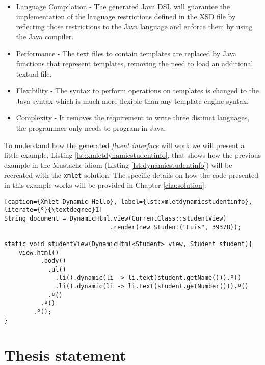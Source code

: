 \begin{itemize}
	\item Language Compilation - The generated Java \ac{DSL} will guarantee the implementation of the language restrictions defined in the \ac{XSD} file by reflecting those restrictions to the Java language and enforce them by using the Java compiler.
	\item Performance - The text files to contain templates are replaced by Java functions that represent templates, removing the need to load an additional textual file.
	\item Flexibility - The syntax to perform operations on templates is changed to the Java syntax which is much more flexible than any template engine syntax.
	\item Complexity - It removes the requirement to write three distinct languages, the programmer only needs to program in Java.
\end{itemize}

\noindent
To understand how the generated \textit{fluent interface} will work we will present a little example, Listing \ref{lst:xmletdynamicstudentinfo}, that shows how the previous example in the Mustache idiom (Listing \ref{lst:dynamicstudentinfo}) will be recreated with the \texttt{xmlet} solution. The specific details on how the code presented in this example works will be provided in Chapter \ref{cha:solution}.

\bigskip


\begin{minipage}{\linewidth}
\begin{lstlisting}[caption={Xmlet Dynamic Hello}, label={lst:xmletdynamicstudentinfo}, literate={º}{\textdegree}1]
String document = DynamicHtml.view(CurrentClass::studentView)
                             .render(new Student("Luis", 39378));

static void studentView(DynamicHtml<Student> view, Student student){
    view.html()
          .body()
            .ul()
              .li().dynamic(li -> li.text(student.getName())).º()
              .li().dynamic(li -> li.text(student.getNumber())).º()
            .º()
          .º()
        .º();   
}
\end{lstlisting}
\end{minipage} 

\section{Thesis statement}
\label{sec:thesisstatement}

